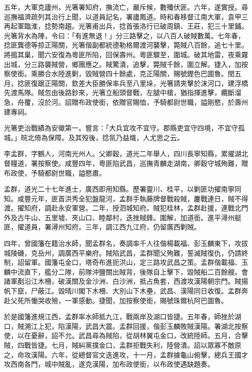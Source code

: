 \begin{pinyinscope}
五年，大軍克廬州，光箸署知府，撫流亡，嚴斥候，數殲伏匪。六年，遂實授。尋巡撫福濟疏列其治行上聞，以道員記名，署廬鳳道。時和春移督江南大軍，袁甲三再起軍臨淮，捻勢南趨。光箸甫出兵，捻首張洛行已破周鎮、王莊，犯三十里鋪。光箸背水為陣，令曰：「有進無退！」分三路擊之，以八百人破賊數萬。七年春，捻匪龔德等掠正陽關，光箸偕副都統德勒格爾渡河襲擊，斃賊八百餘，追七十里。將搗其巢，聞六安復為粵匪所陷，回保壽州。粵匪驟至，圍城。破其地雷，夜乘霧出城，分三路襲賊營，鄉團應之。賊驚潰，追擊，斃賊千餘，圍立解。捷入，加按察使銜。乘勝合水陸進剿，毀賊營四十餘處，克正陽關，賜號鏗色巴圖魯。閏五月，捻匪復踞正陽關，欽差大臣勝保率兵至八里垛，光箸請夾擊於沫河口，建浮橋先渡馬隊。賊忽由後路鈔來，光箸立船頭督戰，左腿中槍，猶指揮進擊，纜斷溜急，舟覆，沒於河。詔贈布政使銜，依贈官賜恤，予騎都尉世職，謚剛愍，於壽州建專祠。

光箸吏治戰績為安徽第一。嘗言：「大兵宜攻不宜守。郡縣吏宜守四境，不宜守孤城。」皖北倚為保障。及其歿後，捻氛乃益熾，人尤思之云。

李孟群，字鶴人，河南光州人。父卿穀，道光二年舉人，四川長寧知縣，累擢湖北督糧道，署按察使。咸豐四年，粵匪陷武昌，巡撫青麟走湖南，卿穀守城殉難，贈布政使，予騎都尉世職，謚愍肅。

孟群，道光二十七年進士，廣西即用知縣。歷署靈川、桂平，以剿匪功擢南寧同知。咸豐元年，匪首洪秀全犯盤龍河，孟群手執藤牌督戰殺賊，鏖戰連日，賊不得渡。擢知府，調赴永安軍營。二年，授泗城知府。賊犯桂林，孟群赴援，連戰北門外及古牛山、五里墟、夾山口、睦鄰村，迭挫賊鋒。圍解，加道銜。進平潯州艇匪，擢道員，署潯州知府。三年，調江西九江府，仍留廣西剿賊。

四年，曾國籓在籍治水師，聞孟群名，奏調率千人往偕楊載福、彭玉麟東下，攻拔城陵磯，克岳州，調廣西平樂府。賊陷武昌，孟群聞父殉難，誓滅賊復仇，仍請終制，詔留軍。國籓屯金口，塔奇布進扼洪山，定三路攻武昌之策。孟群偕載福、玉麟中流直下，艦分二隊，前隊沖鹽關出賊背，後隊自上擊下，毀賊船二百餘艘。會諸軍剷沿江木柵，破漢關及金沙洲、白沙洲，抵占魚套，西渡攻漢陽朝宗門。賊揚帆下竄，尸蔽江。毀晴川閣下木柵、大別山下木壘，武昌、漢陽同日收復。孟群奔赴父死所慟哭收殮，一軍感動。捷聞，加按察使銜，賜號珠爾杭阿巴圖魯。

於是國籓進規江西，孟群率水師抵九江，戰兩岸及湖口皆捷。五年春，師挫於湖口，賊溯江上犯，陷漢陽，武昌大震。孟群回援，偕彭玉麟敗賊漢陽。署湖北按察使，以在憂辭，詔不允。武昌尋為賊陷，從胡林翼屯金口，改統陸師。五月，合擊賊，四戰皆捷。七月，賊糾黨撲金口，孟群拒戰失利，陸營潰。詔以眾寡不敵原之，命攻漢陽。六年，從總督官文迭進攻，十一月，孟群據龜山俯擊，總兵王國才攻西南各門，城中賊亂，遂克漢陽，加布政使銜，以布政使遇缺題奏。


\end{pinyinscope}
